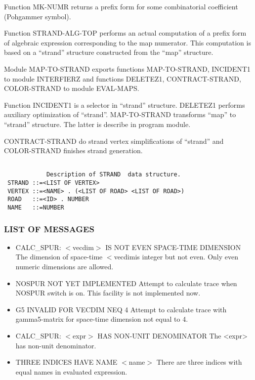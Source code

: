 Function MK-NUMR returns a prefix form for some combinatorial
coefficient (Pohgammer symbol).

Function STRAND-ALG-TOP performs an actual computation of a prefix
form of algebraic expression corresponding to the map numerator. This
computation is based on a ``strand'' structure constructed from the
``map'' structure.

Module MAP-TO-STRAND exports functions MAP-TO-STRAND, INCIDENT1 to
module INTERFIERZ and functions DELETEZ1, CONTRACT-STRAND,
COLOR-STRAND to module EVAL-MAPS.

Function INCIDENT1 is a selector in ``strand'' structure.  DELETEZ1
performs auxiliary optimization of ``strand''.  MAP-TO-STRAND transforms
``map'' to ``strand'' structure.  The latter is describe in program
module.

CONTRACT-STRAND do strand vertex simplifications of ``strand'' and
COLOR-STRAND finishes strand generation.

\begin{verbatim}

            Description of STRAND  data structure.
 STRAND ::=<LIST OF VERTEX>
 VERTEX ::=<NAME> . (<LIST OF ROAD> <LIST OF ROAD>)
 ROAD   ::=<ID> . NUMBER
 NAME   ::=NUMBER
\end{verbatim}


\subsubsection*{LIST OF MESSAGES}

\begin{itemize}

\item{CALC\_SPUR: $<$vecdim$>$ IS NOT EVEN SPACE-TIME DIMENSION}
 The dimension of space-time $<$vecdim$ $is integer but not
even. Only even numeric dimensions are allowed.

\item{NOSPUR NOT YET IMPLEMENTED}
 Attempt to calculate trace when NOSPUR switch is on.  This facility
is not implemented now.

\item{G5 INVALID FOR VECDIM NEQ 4}
 Attempt to calculate trace with gamma5-matrix for space-time
dimension not equal to 4.

\item{CALC\_SPUR: $<$expr$>$ HAS NON-UNIT DENOMINATOR}
The <expr> has non-unit denominator.

\item{THREE INDICES HAVE NAME $<$name$>$}
 There are three indices with equal names in evaluated expression.

\end{itemize}

